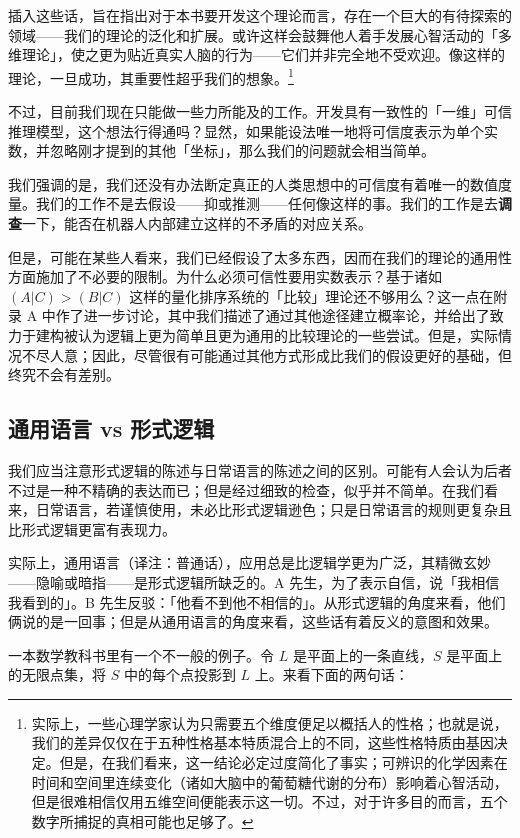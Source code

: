 插入这些话，旨在指出对于本书要开发这个理论而言，存在一个巨大的有待探索的领域——我们的理论的泛化和扩展。或许这样会鼓舞他人着手发展心智活动的「多维理论」，使之更为贴近真实人脑的行为——它们并非完全地不受欢迎。像这样的理论，一旦成功，其重要性超乎我们的想象。\footnote{实际上，一些心理学家认为只需要五个维度便足以概括人的性格；也就是说，我们的差异仅仅在于五种性格基本特质混合上的不同，这些性格特质由基因决定。但是，在我们看来，这一结论必定过度简化了事实；可辨识的化学因素在时间和空间里连续变化（诸如大脑中的葡萄糖代谢的分布）影响着心智活动，但是很难相信仅用五维空间便能表示这一切。不过，对于许多目的而言，五个数字所捕捉的真相可能也足够了。}

不过，目前我们现在只能做一些力所能及的工作。开发具有一致性的「一维」可信推理模型，这个想法行得通吗？显然，如果能设法唯一地将可信度表示为单个实数，并忽略刚才提到的其他「坐标」，那么我们的问题就会相当简单。

我们强调的是，我们还没有办法断定真正的人类思想中的可信度有着唯一的数值度量。我们的工作不是去假设——抑或推测——任何像这样的事。我们的工作是去{\bf 调查}一下，能否在机器人内部建立这样的不矛盾的对应关系。

但是，可能在某些人看来，我们已经假设了太多东西，因而在我们的理论的通用性方面施加了不必要的限制。为什么必须可信性要用实数表示？基于诸如 $(A|C) > (B|C)$ 这样的量化排序系统的「比较」理论还不够用么？这一点在附录 A 中作了进一步讨论，其中我们描述了通过其他途径建立概率论，并给出了致力于建构被认为逻辑上更为简单且更为通用的比较理论的一些尝试。但是，实际情况不尽人意；因此，尽管很有可能通过其他方式形成比我们的假设更好的基础，但终究不会有差别。

\subsection{通用语言 vs 形式逻辑}

我们应当注意形式逻辑的陈述与日常语言的陈述之间的区别。可能有人会认为后者不过是一种不精确的表达而已；但是经过细致的检查，似乎并不简单。在我们看来，日常语言，若谨慎使用，未必比形式逻辑逊色；只是日常语言的规则更复杂且比形式逻辑更富有表现力。

实际上，通用语言（译注：普通话），应用总是比逻辑学更为广泛，其精微玄妙——隐喻或暗指——是形式逻辑所缺乏的。A 先生，为了表示自信，说「我相信我看到的」。B 先生反驳：「他看不到他不相信的」。从形式逻辑的角度来看，他们俩说的是一回事；但是从通用语言的角度来看，这些话有着反义的意图和效果。

一本数学教科书里有一个不一般的例子。令 $L$ 是平面上的一条直线，$S$ 是平面上的无限点集，将 $S$ 中的每个点投影到 $L$ 上。来看下面的两句话：

